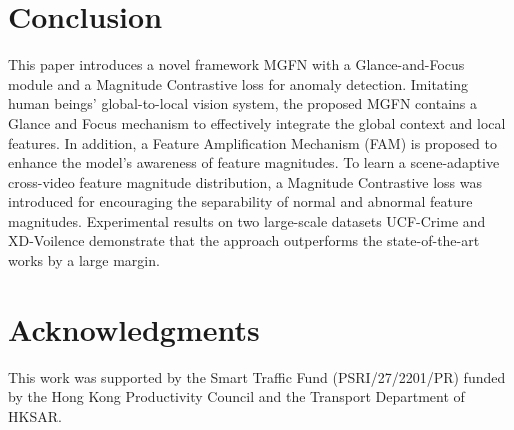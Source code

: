 \documentclass[letterpaper]{article} \usepackage{aaai23}  \usepackage{times}  \usepackage{helvet}  \usepackage{courier}  \usepackage[hyphens]{url}  \usepackage{graphicx} \urlstyle{rm} \def\UrlFont{\rm}  \usepackage{natbib}  \usepackage{caption} \frenchspacing  \setlength{\pdfpagewidth}{8.5in}  \setlength{\pdfpageheight}{11in}  \usepackage{algorithm}
\begin{document}
\section{Conclusion}
This paper introduces a novel framework MGFN with a Glance-and-Focus module and a Magnitude Contrastive loss for anomaly detection. Imitating human beings' global-to-local vision system, the proposed MGFN contains a Glance and Focus mechanism to effectively integrate the global context and local features. In addition, a Feature Amplification Mechanism (FAM) is proposed to enhance the model's awareness of feature magnitudes. To learn a scene-adaptive cross-video feature magnitude distribution, a Magnitude Contrastive loss was introduced for encouraging the separability of normal and abnormal feature magnitudes. Experimental results on two large-scale datasets UCF-Crime and XD-Voilence demonstrate that the approach outperforms the state-of-the-art works by a large margin. 



\clearpage


\section{Acknowledgments}
This work was supported by the Smart Traffic Fund (PSRI/27/2201/PR) funded by the Hong Kong Productivity Council and the Transport Department of HKSAR.
\end{document}
